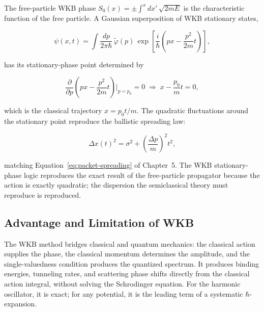 The free-particle WKB phase $S_0(x) = \pm\int^x dx'\,\sqrt{2mE}$ is the characteristic function of the free particle. A Gaussian superposition of WKB stationary states,
\begin{linenomath}
\begin{equation}
\psi(x,t) = \int \frac{dp}{2\pi\hbar}\,\tilde{\varphi}(p)\,\exp\left[\frac{i}{\hbar}\left(px - \frac{p^2}{2m}t\right)\right],
\end{equation}
\end{linenomath}
has its stationary-phase point determined by
\begin{linenomath}
\begin{equation}
\frac{\partial}{\partial p}\left(px - \frac{p^2}{2m}t\right)\bigg|_{p=p_0} = 0 \;\Longrightarrow\; x - \frac{p_0}{m}t = 0,
\end{equation}
\end{linenomath}
which is the classical trajectory $x = p_0 t/m$. The quadratic fluctuations around the stationary point reproduce the ballistic spreading law:
\begin{linenomath}
\begin{equation}
\Delta x(t)^2 = \sigma^2 + \left(\frac{\Delta p}{m}\right)^2 t^2,
\end{equation}
\end{linenomath}
matching Equation~\eqref{eq:packet-spreading} of Chapter~5. The WKB stationary-phase logic reproduces the exact result of the free-particle propagator because the action is exactly quadratic; the dispersion the semiclassical theory must reproduce is reproduced.

\subsection{Advantage and Limitation of WKB}

The WKB method bridges classical and quantum mechanics: the classical action supplies the phase, the classical momentum determines the amplitude, and the single-valuedness condition produces the quantized spectrum. It produces binding energies, tunneling rates, and scattering phase shifts directly from the classical action integral, without solving the Schrodinger equation. For the harmonic oscillator, it is exact; for any potential, it is the leading term of a systematic $\hbar$-expansion.

